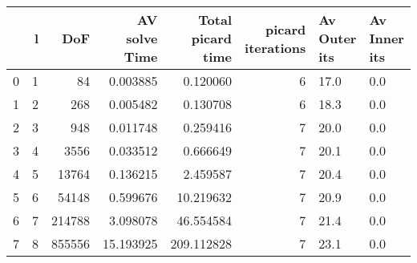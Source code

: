\begin{tabular}{lrrrrrll}
\toprule
{} &  l &     DoF &  AV solve Time &  Total picard time &  picard iterations & Av Outer its & Av Inner its \\
\midrule
0 &  1 &      84 &       0.003885 &           0.120060 &                  6 &         17.0 &          0.0 \\
1 &  2 &     268 &       0.005482 &           0.130708 &                  6 &         18.3 &          0.0 \\
2 &  3 &     948 &       0.011748 &           0.259416 &                  7 &         20.0 &          0.0 \\
3 &  4 &    3556 &       0.033512 &           0.666649 &                  7 &         20.1 &          0.0 \\
4 &  5 &   13764 &       0.136215 &           2.459587 &                  7 &         20.4 &          0.0 \\
5 &  6 &   54148 &       0.599676 &          10.219632 &                  7 &         20.9 &          0.0 \\
6 &  7 &  214788 &       3.098078 &          46.554584 &                  7 &         21.4 &          0.0 \\
7 &  8 &  855556 &      15.193925 &         209.112828 &                  7 &         23.1 &          0.0 \\
\bottomrule
\end{tabular}
